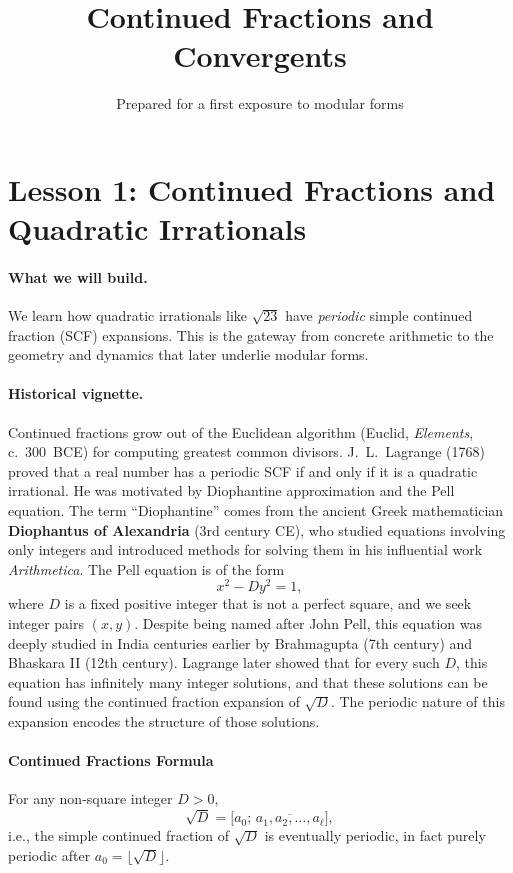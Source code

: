 \documentclass[11pt]{article}
\title{Continued Fractions and Convergents}
\author{Prepared for a first exposure to modular forms}
\date{}
\begin{document}
\maketitle

\section*{Lesson 1: Continued Fractions and Quadratic Irrationals}

\paragraph{What we will build.}
We learn how quadratic irrationals like $\sqrt{23}$ have \emph{periodic} simple continued fraction (SCF) expansions. This is the gateway from concrete arithmetic to the geometry and dynamics that later underlie modular forms.

\paragraph{Historical vignette.}
Continued fractions grow out of the Euclidean algorithm (Euclid, \emph{Elements}, c.\ 300~BCE) for computing greatest common divisors. J.\ L.\ Lagrange (1768) proved that a real number has a periodic SCF if and only if it is a quadratic irrational. He was motivated by Diophantine approximation and the Pell equation. The term “Diophantine” comes from the ancient Greek mathematician \textbf{Diophantus of Alexandria} (3rd century CE), who studied equations involving only integers and introduced methods for solving them in his influential work \emph{Arithmetica}.
\smallskip
\noindent
The Pell equation is of the form
\[
x^2 - D y^2 = 1,
\]
where \( D \) is a fixed positive integer that is not a perfect square, and we seek integer pairs \( (x, y) \). Despite being named after John Pell, this equation was deeply studied in India centuries earlier by Brahmagupta (7th century) and Bhaskara II (12th century). Lagrange later showed that for every such \( D \), this equation has infinitely many integer solutions, and that these solutions can be found using the continued fraction expansion of \( \sqrt{D} \). The periodic nature of this expansion encodes the structure of those solutions.

\paragraph{Continued Fractions Formula}
For any non-square integer $D>0$,
\[
\sqrt{D}=\bigl[a_0;\,\overline{a_1,a_2,\dots,a_\ell}\bigr],
\]
i.e., the simple continued fraction of $\sqrt{D}$ is eventually periodic, in fact purely periodic after $a_0=\lfloor\sqrt{D}\rfloor$.
\end{document}
